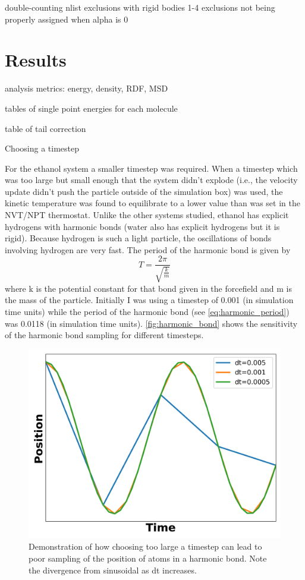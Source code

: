 double-counting nlist exclusions with rigid bodies
1-4 exclusions not being properly assigned when alpha is 0

\section{Results} 
analysis metrics: energy, density, RDF, MSD

tables of single point energies for each molecule

table of tail correction

Choosing a timestep

For the ethanol system a smaller timestep was required.
When a timestep which was too large but small enough that the system didn't explode (i.e., the velocity update didn't push the particle outside of the simulation box) was used, the kinetic temperature was found to equilibrate to a lower value than was set in the NVT/NPT thermostat.
Unlike the other systems studied, ethanol has explicit hydrogens with harmonic bonds (water also has explicit hydrogens but it is rigid). 
Because hydrogen is such a light particle, the oscillations of bonds involving hydrogen are very fast.
The period of the harmonic bond is given by
\begin{equation}\label{eq:harmonic_period}
    T = \frac{2\pi}{\sqrt{\frac{k}{m}}}
\end{equation}
where k is the potential constant for that bond given in the forcefield and m is the mass of the particle.
Initially I was using a timestep of 0.001 (in simulation time units) while the period of the harmonic bond (see \autoref{eq:harmonic_period}) was 0.0118 (in simulation time units). \autoref{fig:harmonic_bond} shows the sensitivity of the harmonic bond sampling for different timesteps.
\begin{figure}[h!]
    \centering
    \includegraphics[width=0.8\linewidth,keepaspectratio]{figures/rep_study/harmonic_bond.png}
    \caption{Demonstration of how choosing too large a timestep can lead to poor sampling of the position of atoms in a harmonic bond. Note the divergence from sinusoidal as dt increases.}\label{fig:harmonic_bond}
\end{figure}
